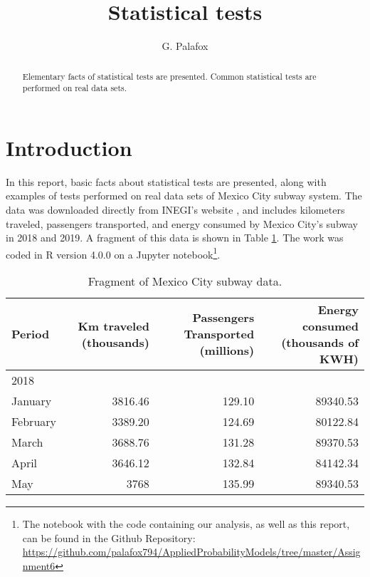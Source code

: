 \documentclass[letterpaper, 10 pt, conference]{article}
\title{Statistical tests}
\author{G. Palafox}
\begin{document}
\maketitle

\begin{abstract}
Elementary facts of statistical tests are presented. Common statistical tests are performed on real data sets.
\end{abstract}

\section{Introduction}
In this report, basic facts about statistical tests are presented, along with examples of tests performed on real data sets of Mexico City subway system. The data was downloaded directly from INEGI's website \cite{inegi}, and includes kilometers traveled, passengers transported, and energy consumed by Mexico City's subway in 2018 and 2019. A fragment of this data is shown in Table \ref{tab:data}. The work was coded in R version 4.0.0 \cite{R} on a Jupyter \cite{jupyter} notebook\footnote{The notebook with the code containing our analysis, as well as this report, can be found in the Github Repository: \url{https://github.com/palafox794/AppliedProbabilityModels/tree/master/Assignment6}}. 

\begin{table}
	\centering
	\caption{Fragment of Mexico City subway data.}
	\begin{tabular}{lrrr}
		\hline
		Period & Km traveled (thousands) & Passengers Transported (millions) & Energy consumed (thousands of KWH) \\ 
		\hline
		2018 &  &  &  \\ 
		January & 3816.46 & 129.10 & 89340.53 \\ 
		February & 3389.20 & 124.69 & 80122.84 \\ 
		March & 3688.76 & 131.28 & 89370.53 \\ 
		April & 3646.12 & 132.84 & 84142.34 \\ 
		May & 3768 & 135.99 & 89340.53 \\ 
		\hline
	\end{tabular}
	\label{tab:data}
\end{table}
\end{document}
